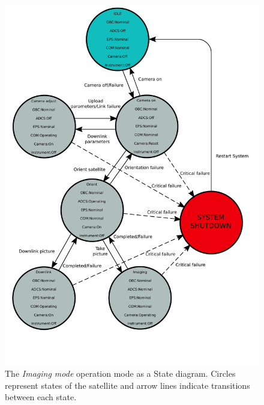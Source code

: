 \documentclass[english,12pt,a4paper,pdftex,elec,utf8]{aaltothesis}
\begin{document}
\begin{figure}[h!]
\centering
\includegraphics[scale=0.6]{imagingstate}
\caption{The \textit{Imaging mode} operation mode as a State diagram. Circles represent states of the satellite and arrow lines indicate transitions between each state. }
\label{imagingstate}
\end{figure}   
 




\clearpage
\end{document}
